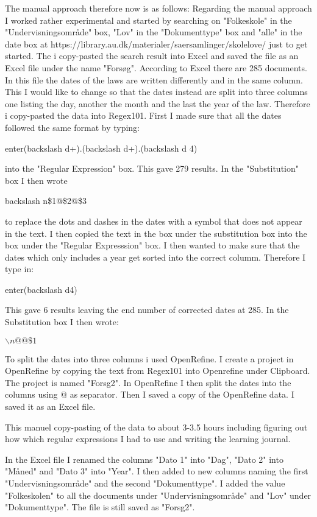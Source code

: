 \documentclass{article}
\begin{document}
The manual approach therefore now is as follows: Regarding the manual approach I worked rather experimental and started by searching on "Folkeskole" in the "Undervisningsområde" box, "Lov" in the "Dokumenttype" box and "alle" in the date box at https://library.au.dk/materialer/saersamlinger/skolelove/ just to get started. The i copy-pasted the search result into Excel and saved the file as an Excel file under the name "Forsøg". According to Excel there are 285 documents. In this file the dates of the laws are written differently and in the same column. This I would like to change so that the dates instead are split into three columns one listing the day, another the month and the last the year of the law. Therefore i copy-pasted the data into Regex101. First I made sure that all the dates followed the same format by typing:
\begin{center}
    enter(backslash d+).(backslash d+).(backslash d {4})
\end{center}
into the "Regular Expression" box. This gave 279 results. In the "Substitution" box I then wrote
\begin{center}
    backslash n\$1@\$2@\$3
\end{center}
to replace the dots and dashes in the dates with a symbol that does not appear in the text. I then copied the text in the box under the substitution box into the box under the "Regular Expresssion" box. I then wanted to make sure that the dates which only includes a year get sorted into the correct columm. Therefore I type in:
\begin{center}
    enter(backslash d{4})
\end{center}
This gave 6 results leaving the end number of corrected dates at 285. In the Substitution box I then wrote: 
\begin{center}
    $\backslash n@@\$1$
\end{center}
To split the dates into three columns i used OpenRefine. I  create a project in OpenRefine by copying the text from Regex101 into Openrefine under Clipboard. The project is named "Forsg2". In OpenRefine I then split the dates into the columns using @ as separator. Then I saved a copy of the OpenRefine data. I saved it as an Excel file. 

This manuel copy-pasting of the data to about 3-3.5 hours including figuring out how which regular expressions I had to use and writing the learning journal.

In the Excel file I renamed the columns "Dato 1" into "Dag", "Dato 2" into "Måned" and "Dato 3" into "Year". I then added to new columns naming the first "Undervisningsområde" and the second "Dokumenttype". I added the value "Folkeskolen" to all the documents under "Undervisningsområde" and "Lov" under "Dokumenttype". The file is still saved as "Forsg2".
\newpage
\end{document}
